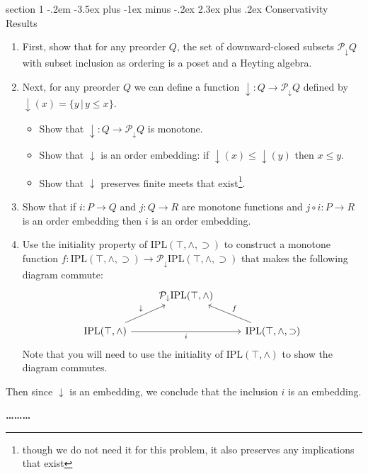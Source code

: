 \documentclass[12pt]{article}
\makeatletter
\newenvironment{problem}{\@startsection
       {section}
       {1}
       {-.2em}
       {-3.5ex plus -1ex minus -.2ex}
       {2.3ex plus .2ex}
       {\pagebreak[3]%
       \large\bf\noindent{Problem }
       }
       }
       {%
       \begin{center}\large\bf \ldots\ldots\ldots\end{center}}
\newcommand{\meet}{\wedge}
\newcommand{\iplmeets}{\textrm{IPL}(\top,\meet)}
\newcommand{\iplneg}{\textrm{IPL}(\top,\meet,\supset)}
\newcommand{\downset}{\mathcal P_{\downarrow}}
\newcommand{\down}{{\downarrow}}
\makeatother
\begin{document}
\begin{problem}{Conservativity Results}
  \begin{enumerate}
  \item First, show that for any preorder $Q$, the set of downward-closed
    subsets $\downset Q$ with subset inclusion as ordering
    is a poset and a Heyting algebra.
  \item Next, for any preorder $Q$ we can define a function $\down : Q \to \downset Q$ defined by $\down(x) = \{ y \,|\, y \leq x \}$.
    \begin{itemize}
    \item Show that $\down : Q \to \downset Q$ is monotone.
    \item Show that $\down$ is an order embedding: if $\down(x) \leq \down(y)$ then $x \leq y$.
    \item Show that $\down$ preserves finite meets that exist\footnote{though we do not need it for this problem, it also preserves any implications that exist}.
    \end{itemize}
  \item Show that if $i : P \to Q$ and $j : Q \to R$ are monotone
    functions and $j \circ i : P \to R$ is an order embedding then $i$
    is an order embedding.
  \item Use the initiality property of $\iplneg$ to
    construct a monotone function $f : \iplneg \to
    {\downset \iplneg}$ that makes the following diagram
    commute:
    \[\begin{tikzcd}
	& {\downset {\iplmeets}} \\
	{\iplmeets} && {\iplneg}
	\arrow["\down", from=2-1, to=1-2]
	\arrow["i"', from=2-1, to=2-3]
	\arrow["f"', from=2-3, to=1-2]
    \end{tikzcd}\]
    Note that you will need to use the initiality of $\iplmeets$
    to show the diagram commutes.
  \end{enumerate}
  Then since $\down$ is an embedding, we conclude that the inclusion $i$ is an
  embedding.
\end{problem}
\end{document}
